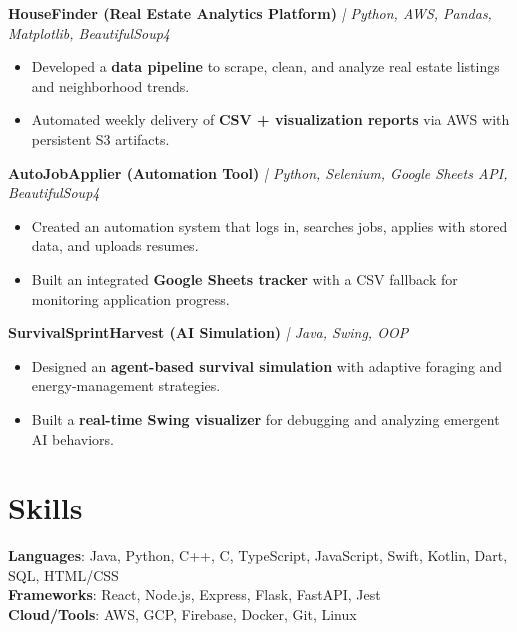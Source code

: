 \documentclass[8pt]{resume}
\begin{document}
\textbf{HouseFinder (Real Estate Analytics Platform)} \textit{| Python, AWS, Pandas, Matplotlib, BeautifulSoup4}
\begin{itemize}
    \item Developed a \textbf{data pipeline} to scrape, clean, and analyze real estate listings and neighborhood trends.
    \item Automated weekly delivery of \textbf{CSV + visualization reports} via AWS with persistent S3 artifacts.
\end{itemize}

\textbf{AutoJobApplier (Automation Tool)} \textit{| Python, Selenium, Google Sheets API, BeautifulSoup4}
\begin{itemize}
    \item Created an automation system that logs in, searches jobs, applies with stored data, and uploads resumes.
    \item Built an integrated \textbf{Google Sheets tracker} with a CSV fallback for monitoring application progress.
\end{itemize}

\textbf{SurvivalSprintHarvest (AI Simulation)} \textit{| Java, Swing, OOP}
\begin{itemize}
    \item Designed an \textbf{agent-based survival simulation} with adaptive foraging and energy-management strategies.
    \item Built a \textbf{real-time Swing visualizer} for debugging and analyzing emergent AI behaviors.
\end{itemize}

\section{Skills}
\textbf{Languages}: Java, Python, C++, C, TypeScript, JavaScript, Swift, Kotlin, Dart, SQL, HTML/CSS\\
\textbf{Frameworks}: React, Node.js, Express, Flask, FastAPI, Jest\\
\textbf{Cloud/Tools}: AWS, GCP, Firebase, Docker, Git, Linux\\
\end{document}
